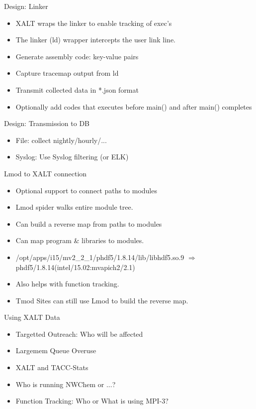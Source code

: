 \documentclass{beamer}
\begin{document}
\begin{frame}{Design: Linker}
  \begin{itemize}
    \item XALT wraps the linker to enable tracking of exec's
    \item The linker (ld) wrapper intercepts the user link line.
    \item Generate assembly code: key-value pairs
    \item Capture tracemap output from ld
    \item Transmit collected data in *.json format
    \item Optionally add codes that executes before main() and after main() completes
  \end{itemize}
\end{frame}

\begin{frame}{Design: Transmission to DB}
  \begin{itemize}
    \item File: collect nightly/hourly/...
    \item Syslog: Use Syslog filtering (or ELK)
  \end{itemize}
\end{frame}

\begin{frame}{Lmod to XALT connection}
  \begin{itemize}
    \item Optional support to connect paths to modules
    \item Lmod spider walks entire module tree.
    \item Can build a reverse map from paths to modules
    \item Can map program \& libraries to modules.
    \item /opt/apps/i15/mv2\_2\_1/phdf5/1.8.14/lib/libhdf5.so.9
      $\Rightarrow$ phdf5/1.8.14(intel/15.02:mvapich2/2.1)
    \item Also helps with function tracking.
    \item Tmod Sites can still use Lmod to build the reverse map.
  \end{itemize}
\end{frame}

\begin{frame}{Using XALT Data}
  \begin{itemize}
    \item Targetted Outreach: Who will be affected
    \item Largemem Queue Overuse
    \item XALT and TACC-Stats
    \item Who is running NWChem or ...?
    \item Function Tracking: Who or What is using MPI-3?      
  \end{itemize}
\end{frame}
\end{document}
